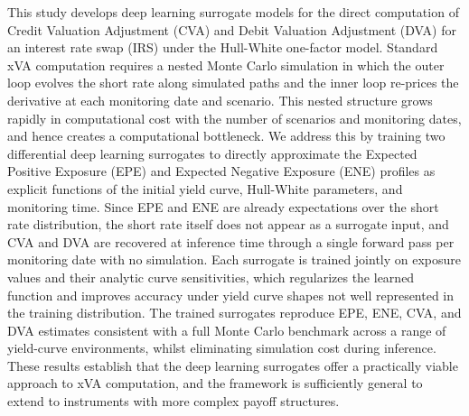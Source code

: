 This study develops deep learning surrogate models for the direct computation of Credit Valuation Adjustment (CVA) and Debit Valuation Adjustment (DVA) for an interest rate swap (IRS) under the Hull-White one-factor model. Standard xVA computation requires a nested Monte Carlo simulation in which the outer loop evolves the short rate along simulated paths and the inner loop re-prices the derivative at each monitoring date and scenario. This nested structure grows rapidly in computational cost with the number of scenarios and monitoring dates, and hence creates a computational bottleneck. We address this by training two differential deep learning surrogates to directly approximate the Expected Positive Exposure (EPE) and Expected Negative Exposure (ENE) profiles as explicit functions of the initial yield curve, Hull-White parameters, and monitoring time. Since EPE and ENE are already expectations over the short rate distribution, the short rate itself does not appear as a surrogate input, and CVA and DVA are recovered at inference time through a single forward pass per monitoring date with no simulation. Each surrogate is trained jointly on exposure values and their analytic curve sensitivities, which regularizes the learned function and improves accuracy under yield curve shapes not well represented in the training distribution. The trained surrogates reproduce EPE, ENE, CVA, and DVA estimates consistent with a full Monte Carlo benchmark across a range of yield-curve environments, whilst eliminating simulation cost during inference. These results establish that the deep learning surrogates offer a practically viable approach to xVA computation, and the framework is sufficiently general to extend to instruments with more complex payoff structures.
